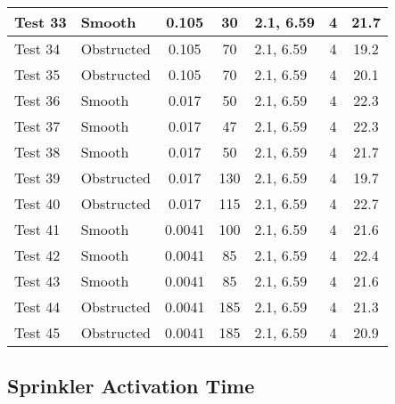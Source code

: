 \begin{table}[!ht]
\begin{center}
\begin {tabular}{|l|l|c|c|l|c|c|}
Test 33    &  Smooth        &  0.105            &  30               &  2.1, 6.59  &  4             &  21.7              \\ \hline
Test 34    &  Obstructed    &  0.105            &  70               &  2.1, 6.59  &  4             &  19.2              \\ \hline
Test 35    &  Obstructed    &  0.105            &  70               &  2.1, 6.59  &  4             &  20.1              \\ \hline
Test 36    &  Smooth        &  0.017            &  50               &  2.1, 6.59  &  4             &  22.3              \\ \hline
Test 37    &  Smooth        &  0.017            &  47               &  2.1, 6.59  &  4             &  22.3              \\ \hline
Test 38    &  Smooth        &  0.017            &  50               &  2.1, 6.59  &  4             &  21.7              \\ \hline
Test 39    &  Obstructed    &  0.017            &  130              &  2.1, 6.59  &  4             &  19.7              \\ \hline
Test 40    &  Obstructed    &  0.017            &  115              &  2.1, 6.59  &  4             &  22.7              \\ \hline
Test 41    &  Smooth        &  0.0041           &  100              &  2.1, 6.59  &  4             &  21.6              \\ \hline
Test 42    &  Smooth        &  0.0041           &  85               &  2.1, 6.59  &  4             &  22.4              \\ \hline
Test 43    &  Smooth        &  0.0041           &  85               &  2.1, 6.59  &  4             &  21.6              \\ \hline
Test 44    &  Obstructed    &  0.0041           &  185              &  2.1, 6.59  &  4             &  21.3              \\ \hline
Test 45    &  Obstructed    &  0.0041           &  185              &  2.1, 6.59  &  4             &  20.9              \\ \hline
\end{tabular}
\end{center}
\end{table}


\clearpage


\subsection*{Sprinkler Activation Time}

